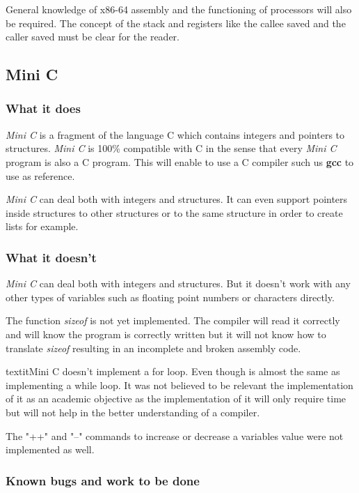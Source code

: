 \documentclass[conference]{IEEEtran}
\begin{document}
General knowledge of x86-64 assembly and the functioning of processors will also be required. The concept of the stack and registers like the callee saved and the caller saved must be clear for the reader.

\subsection{Mini C}
\subsubsection{What it does}
\textit{Mini C} is a fragment of the language C which contains integers and pointers to structures. \textit{Mini C} is 100\% compatible with C in the sense that every \textit{Mini C} program is also a C program. This will enable to use a C compiler such us \textbf{gcc} to use as reference. 

\textit{Mini C} can deal both with integers and structures. It can even support pointers inside structures to other structures or to the same structure in order to create lists for example. 

\subsubsection{What it doesn't}
\textit{Mini C} can deal both with integers and structures. But it doesn't work with any other types of variables such as floating point numbers or characters directly.

The function \textit{sizeof} is not yet implemented. The compiler will read it correctly and will know the program is correctly written but it will not know how to translate \textit{sizeof} resulting in an incomplete and broken assembly code.  

textit{Mini C} doesn't implement a for loop. Even though is almost the same as implementing a while loop. It was not believed to be relevant the implementation of it as an academic objective as the implementation of it will only require time but will not help in the better understanding of a compiler.

The "++" and "--" commands to increase or decrease a variables value were not implemented as well.

\subsubsection{Known bugs and work to be done} 
\end{document}

